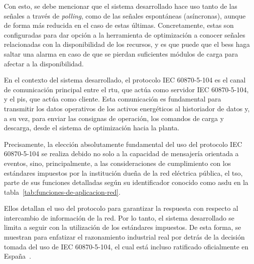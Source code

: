 Con esto, se debe mencionar que el sistema desarrollado hace uso tanto de las señales a través de \textit{polling}, como de las señales espontáneas (asíncronas), aunque de forma más reducida en el caso de estas últimas. Concretamente, estas son configuradas para dar opción a la herramienta de optimización a conocer señales relacionadas con la disponibilidad de los recursos, y es que puede que el \gls{bess} haga saltar una alarma en caso de que se pierdan suficientes módulos de carga para afectar a la disponibilidad.

En el contexto del sistema desarrollado, el protocolo IEC 60870{-}5{-}104 es el canal de comunicación principal entre el \gls{rtu}, que actúa como servidor IEC 60870{-}5{-}104, y el \gls{pis}, que actúa como cliente. Esta comunicación es fundamental para transmitir los datos operativos de los activos energéticos al historiador de datos y, a su vez, para enviar las consignas de operación, los comandos de carga y descarga, desde el sistema de optimización hacia la planta.

Precisamente, la elección absolutamente fundamental del uso del protocolo IEC 60870{-}5{-}104 se realiza debido no solo a la capacidad de mensajería orientada a eventos, sino, principalmente, a las consideraciones de cumplimiento con los estándares impuestos por la institución dueña de la red eléctrica pública, el \gls{tso}, parte de sus funciones detalladas según su identificador conocido como \gls{asdu} en la tabla~\ref{tab:funciones-de-aplicacion-red}.

Ellos detallan el uso del protocolo para garantizar la respuesta con respecto al intercambio de información de la red. Por lo tanto, el sistema desarrollado se limita a seguir con la utilización de los estándares impuestos. De esta forma, se muestran para enfatizar el razonamiento industrial real por detrás de la decisión tomada del uso de IEC 60870{-}5{-}104, el cual está incluso ratificado oficialmente en España~\cite{une2017equipos}.

